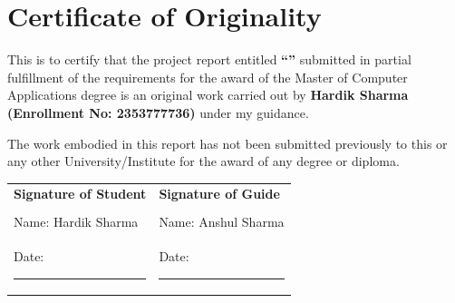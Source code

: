 \chapter*{Certificate of Originality}

This is to certify that the project report entitled \textbf{``\projecttitle''} submitted in partial fulfillment of the requirements for the award of the Master of Computer Applications degree is an original work carried out by \textbf{Hardik Sharma (Enrollment No: 2353777736)} under my guidance.

The work embodied in this report has not been submitted previously to this or any other University/Institute for the award of any degree or diploma.

\vspace{1.5cm}
\begin{tabular}{p{}p{}}
\textbf{Signature of Student} & \textbf{Signature of Guide} \\
\vspace{1.8cm} & \\
Name: Hardik Sharma & Name: Anshul Sharma \\
Date: \rule{3cm}{0.15mm} & Date: \rule{3cm}{0.15mm} \\
\end{tabular}

\newpage
